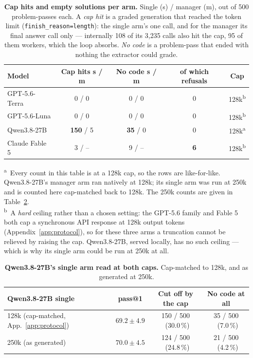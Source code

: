 \documentclass{article}
\begin{document}
\begin{table}[htbp]
\centering
\caption{\textbf{Cap hits and empty solutions per arm.} Single (s) / manager (m), out of 500
problem-passes each. A \emph{cap hit} is a graded generation that reached the token limit
(\texttt{finish\_reason=length}): the single arm's one call, and for the manager its final answer
call only --- internally 108 of its 3{,}235 calls also hit the cap, 95 of them workers, which the
loop absorbs. \emph{No code} is a problem-pass that ended with nothing the extractor could grade.}
\label{tab:caps}
\small
\begin{tabular}{@{}lcccc@{}}
\toprule
\textbf{Model} & \textbf{Cap hits s / m} & \textbf{No code s / m} &
\textbf{of which refusals} & \textbf{Cap} \\
\midrule
GPT-5.6-Terra  & 0 / 0            & 0 / 0          & 0 & 128k\textsuperscript{b} \\
GPT-5.6-Luna   & 0 / 0            & 0 / 0          & 0 & 128k\textsuperscript{b} \\
Qwen3.8-27B    & \textbf{150} / 5 & \textbf{35} / 0 & 0 & 128k\textsuperscript{a} \\
Claude Fable 5 & 3 / --           & 9 / --         & \textbf{6} & 128k\textsuperscript{b} \\
\bottomrule
\end{tabular}

\vspace{0.6ex}
\begin{minipage}{0.92\linewidth}
\footnotesize
\textsuperscript{a}~Every count in this table is at a 128k cap, so the rows are like-for-like.
Qwen3.8-27B's manager arm ran natively at 128k; its single arm was run at 250k and is counted here
cap-matched back to 128k. The 250k counts are given in Table~\ref{tab:qwen-caps}.\\
\textsuperscript{b}~A \emph{hard} ceiling rather than a chosen setting: the GPT-5.6 family and
Fable 5 both cap a synchronous API response at 128k output tokens (Appendix~\ref{app:protocol}), so
for these three arms a truncation cannot be relieved by raising the cap. Qwen3.8-27B, served
locally, has no such ceiling --- which is why its single arm could be run at 250k at all.
\end{minipage}
\end{table}

\begin{table}[htbp]
\centering
\caption{\textbf{Qwen3.8-27B's single arm read at both caps.} Cap-matched to 128k, and as generated
at 250k.}
\label{tab:qwen-caps}
\small
\begin{tabular}{@{}lccc@{}}
\toprule
\textbf{Qwen3.8-27B single} & \textbf{pass@1} & \textbf{Cut off by the cap} &
\textbf{No code at all} \\
\midrule
128k (cap-matched, App.~\ref{app:protocol}) & $69.2 \pm 4.9$ & 150 / 500 \ (30.0\,\%) & 35 / 500 \ (7.0\,\%) \\
250k (as generated)                         & $70.0 \pm 4.5$ & 124 / 500 \ (24.8\,\%) & 21 / 500 \ (4.2\,\%) \\
\bottomrule
\end{tabular}
\end{table}
\end{document}
